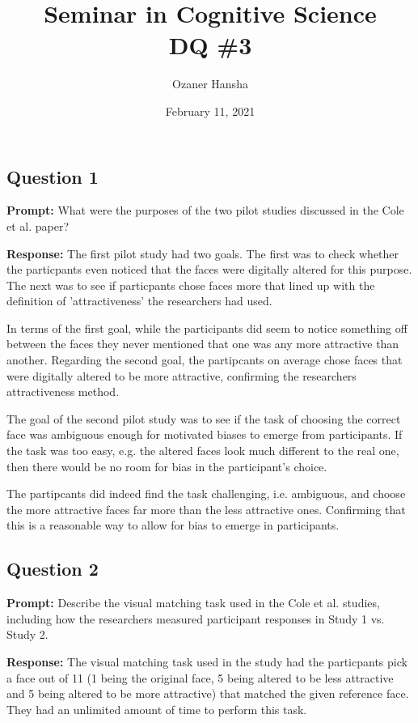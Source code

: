\documentclass{article}
\begin{document}
\title{Seminar in Cognitive Science\\ DQ \#3}
\author{Ozaner Hansha}
\date{February 11, 2021}
\maketitle

\subsection*{Question 1}
\noindent\textbf{Prompt:} What were the purposes of the two pilot studies discussed in the Cole et al. paper? 
\bigskip

\noindent\textbf{Response:} The first pilot study had two goals. The first was to check whether the particpants even noticed that the faces were digitally altered for this purpose. The next was to see if particpants chose faces more that lined up with the definition of 'attractiveness' the researchers had used.

In terms of the first goal, while the participants did seem to notice something off between the faces they never mentioned that one was any more attractive than another. Regarding the second goal, the partipcants on average chose faces that were digitally altered to be more attractive, confirming the researchers attractiveness method.

The goal of the second pilot study was to see if the task of choosing the correct face was ambiguous enough for motivated biases to emerge from participants. If the task was too easy, e.g. the altered faces look much different to the real one, then there would be no room for bias in the participant's choice.

The partipcants did indeed find the task challenging, i.e. ambiguous, and choose the more attractive faces far more than the less attractive ones. Confirming that this is a reasonable way to allow for bias to emerge in participants.

\subsection*{Question 2}
\noindent\textbf{Prompt:} Describe the visual matching task used in the Cole et al. studies, including how the researchers measured participant responses in Study 1 vs. Study 2.
\bigskip

\noindent\textbf{Response:} The visual matching task used in the study had the particpants pick a face out of 11 (1 being the original face, 5 being altered to be less attractive and 5 being altered to be more attractive) that matched the given reference face. They had an unlimited amount of time to perform this task.
\end{document}
